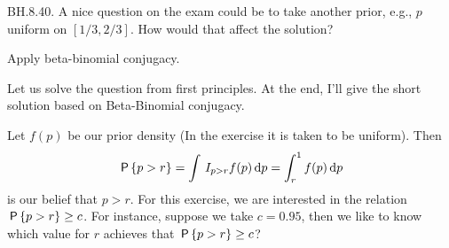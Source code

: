 \setcounter{theorem}{39}
\begin{exercise}
BH.8.40. A nice question on the exam could be to take another prior, e.g., $p$ uniform on $[1/3, 2/3]$. How would that affect the solution?
\begin{hint}
Apply beta-binomial conjugacy.
\end{hint}
\begin{solution}
Let us solve the question from first principles. At the end, I'll give the short solution based on Beta-Binomial conjugacy.

Let $f(p)$ be our prior density (In the exercise it is taken to be uniform). Then
\begin{align*}
\P{p>r}=\int \1{p>r}f(p) \d p = \int_{r}^{1} f(p) \d p
\end{align*}
is our belief that $p>r$. For this exercise, we are interested in the relation $\P{p>r} \geq c$. For instance, suppose we take $c=0.95$, then we like to know which value for $r$ achieves that $\P{p>r} \geq c$?


\end{solution}
\end{exercise}
